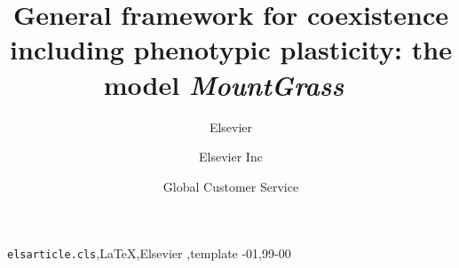 \documentclass[review]{elsarticle}
\newcommand{\model}{\textbf{\textit{MountGrass}}~}
\begin{document}
\begin{frontmatter}

\title{General framework for coexistence including phenotypic plasticity: the model \model}

\author{Elsevier}
\address{Radarweg 29, Amsterdam}

\author[mymainaddress,mysecondaryaddress]{Elsevier Inc}

\author[mysecondaryaddress]{Global Customer Service}

\address[mymainaddress]{1600 John F Kennedy Boulevard, Philadelphia}
\address[mysecondaryaddress]{360 Park Avenue South, New York}

\begin{abstract}
\end{abstract}

\begin{keyword}
\texttt{elsarticle.cls}\sep \LaTeX\sep Elsevier \sep template
-01\sep  99-00
\end{keyword}

\end{frontmatter}

\linenumbers
\end{document}
